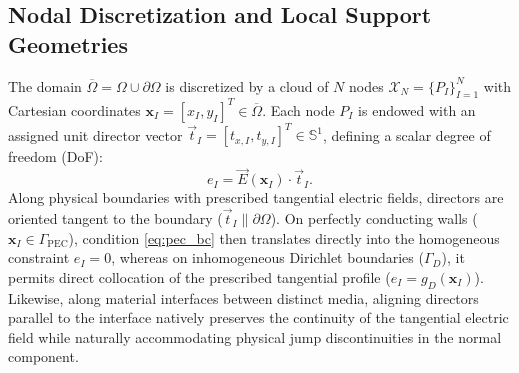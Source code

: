 \documentclass[VANCOUVER,Times1COL]{WileyNJD-v5}
\begin{document}
\subsection{Nodal Discretization and Local Support Geometries}
\label{subsec:nodal_discretization}

The domain $\overline{\Omega} = \Omega \cup \partial\Omega$ is discretized by a cloud of $N$ nodes $\mathcal{X}_N = \{P_I\}_{I=1}^N$ with Cartesian coordinates $\mathbf{x}_I = [x_I, y_I]^T \in \overline{\Omega}$. Each node $P_I$ is endowed with an assigned unit director vector $\vec{t}_I = [t_{x,I}, t_{y,I}]^T \in \mathbb{S}^1$, defining a scalar degree of freedom (DoF):
\begin{equation}
    e_I = \vec{E}(\mathbf{x}_I) \cdot \vec{t}_I.
\end{equation}
Along physical boundaries with prescribed tangential electric fields, directors are oriented tangent to the boundary ($\vec{t}_I \parallel \partial\Omega$). On perfectly conducting walls ($\mathbf{x}_I \in \Gamma_{\mathrm{PEC}}$), condition \eqref{eq:pec_bc} then translates directly into the homogeneous constraint $e_I = 0$, whereas on inhomogeneous Dirichlet boundaries ($\Gamma_D$), it permits direct collocation of the prescribed tangential profile ($e_I = g_D(\mathbf{x}_I)$). Likewise, along material interfaces between distinct media, aligning directors parallel to the interface natively preserves the continuity of the tangential electric field while naturally accommodating physical jump discontinuities in the normal component.
\end{document}
